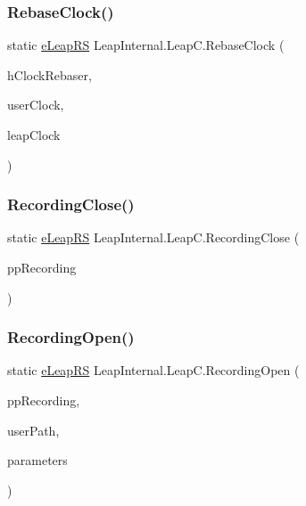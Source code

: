 \subsubsection{\texorpdfstring{RebaseClock()}{RebaseClock()}}
{\footnotesize\ttfamily static \mbox{\hyperlink{namespace_leap_internal_ae50b07d24c508b84273392b6dcbea1d9}{e\+Leap\+RS}} Leap\+Internal.\+Leap\+C.\+Rebase\+Clock (\begin{DoxyParamCaption}\item[{Int\+Ptr}]{h\+Clock\+Rebaser,  }\item[{Int64}]{user\+Clock,  }\item[{out Int64}]{leap\+Clock }\end{DoxyParamCaption})}

\mbox{\label{class_leap_internal_1_1_leap_c_a05178f96e5b75934ec9e6a80156e3a6e}} 
\subsubsection{\texorpdfstring{RecordingClose()}{RecordingClose()}}
{\footnotesize\ttfamily static \mbox{\hyperlink{namespace_leap_internal_ae50b07d24c508b84273392b6dcbea1d9}{e\+Leap\+RS}} Leap\+Internal.\+Leap\+C.\+Recording\+Close (\begin{DoxyParamCaption}\item[{ref Int\+Ptr}]{pp\+Recording }\end{DoxyParamCaption})}

\mbox{\label{class_leap_internal_1_1_leap_c_a10463b1cc87a5cc7b102a69d5b99c06b}} 
\subsubsection{\texorpdfstring{RecordingOpen()}{RecordingOpen()}}
{\footnotesize\ttfamily static \mbox{\hyperlink{namespace_leap_internal_ae50b07d24c508b84273392b6dcbea1d9}{e\+Leap\+RS}} Leap\+Internal.\+Leap\+C.\+Recording\+Open (\begin{DoxyParamCaption}\item[{ref Int\+Ptr}]{pp\+Recording,  }\item[{string}]{user\+Path,  }\item[{\mbox{\hyperlink{struct_leap_internal_1_1_leap_c_1_1_l_e_a_p___r_e_c_o_r_d_i_n_g___p_a_r_a_m_e_t_e_r_s}{L\+E\+A\+P\+\_\+\+R\+E\+C\+O\+R\+D\+I\+N\+G\+\_\+\+P\+A\+R\+A\+M\+E\+T\+E\+RS}}}]{parameters }\end{DoxyParamCaption})}

